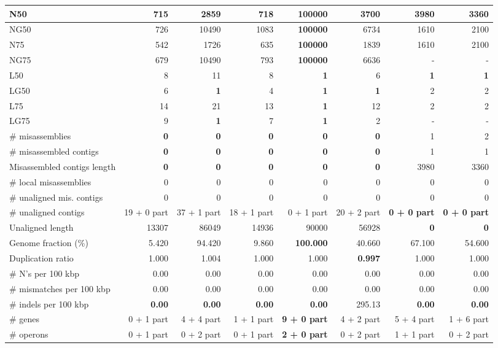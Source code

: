 \documentclass[12pt,a4paper]{article}
\begin{document}
\begin{table}[ht]
\begin{center}
\begin{tabular}{|l*{7}{|r}|}
N50 & 715 & 2859 & 718 & {\bf 100000} & 3700 & 3980 & 3360 \\ \hline
NG50 & 726 & 10490 & 1083 & {\bf 100000} & 6734 & 1610 & 2100 \\ \hline
N75 & 542 & 1726 & 635 & {\bf 100000} & 1839 & 1610 & 2100 \\ \hline
NG75 & 679 & 10490 & 793 & {\bf 100000} & 6636 & - & - \\ \hline
L50 & 8 & 11 & 8 & {\bf 1} & 6 & {\bf 1} & {\bf 1} \\ \hline
LG50 & 6 & {\bf 1} & 4 & {\bf 1} & {\bf 1} & 2 & 2 \\ \hline
L75 & 14 & 21 & 13 & {\bf 1} & 12 & 2 & 2 \\ \hline
LG75 & 9 & {\bf 1} & 7 & {\bf 1} & 2 & - & - \\ \hline
\# misassemblies & {\bf 0} & {\bf 0} & {\bf 0} & {\bf 0} & {\bf 0} & 1 & 2 \\ \hline
\# misassembled contigs & {\bf 0} & {\bf 0} & {\bf 0} & {\bf 0} & {\bf 0} & 1 & 1 \\ \hline
Misassembled contigs length & {\bf 0} & {\bf 0} & {\bf 0} & {\bf 0} & {\bf 0} & 3980 & 3360 \\ \hline
\# local misassemblies & 0 & 0 & 0 & 0 & 0 & 0 & 0 \\ \hline
\# unaligned mis. contigs & 0 & 0 & 0 & 0 & 0 & 0 & 0 \\ \hline
\# unaligned contigs & 19 + 0 part & 37 + 1 part & 18 + 1 part & 0 + 1 part & 20 + 2 part & {\bf 0 + 0 part} & {\bf 0 + 0 part} \\ \hline
Unaligned length & 13307 & 86049 & 14936 & 90000 & 56928 & {\bf 0} & {\bf 0} \\ \hline
Genome fraction (\%) & 5.420 & 94.420 & 9.860 & {\bf 100.000} & 40.660 & 67.100 & 54.600 \\ \hline
Duplication ratio & 1.000 & 1.004 & 1.000 & 1.000 & {\bf 0.997} & 1.000 & 1.000 \\ \hline
\# N's per 100 kbp & 0.00 & 0.00 & 0.00 & 0.00 & 0.00 & 0.00 & 0.00 \\ \hline
\# mismatches per 100 kbp & 0.00 & 0.00 & 0.00 & 0.00 & 0.00 & 0.00 & 0.00 \\ \hline
\# indels per 100 kbp & {\bf 0.00} & {\bf 0.00} & {\bf 0.00} & {\bf 0.00} & 295.13 & {\bf 0.00} & {\bf 0.00} \\ \hline
\# genes & 0 + 1 part & 4 + 4 part & 1 + 1 part & {\bf 9 + 0 part} & 4 + 2 part & 5 + 4 part & 1 + 6 part \\ \hline
\# operons & 0 + 1 part & 0 + 2 part & 0 + 1 part & {\bf 2 + 0 part} & 0 + 2 part & 1 + 1 part & 0 + 2 part \\ \hline

\end{tabular}
\end{center}
\end{table}
\end{document}
